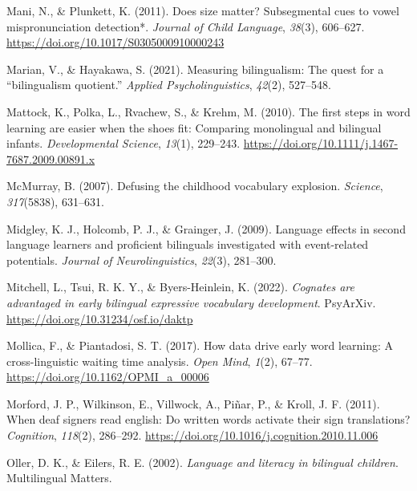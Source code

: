 \documentclass[
]{article}
\newlength{\cslhangindent}
\newlength{\cslentryspacingunit} %
\newenvironment{CSLReferences}[2] %
 {%
  \setlength{\parindent}{0pt}
  \ifodd #1
  \let\oldpar\par
  \def\par{\hangindent=\cslhangindent\oldpar}
  \fi
  \setlength{\parskip}{#2\cslentryspacingunit}
 }%
 {}
\begin{document}
\begin{CSLReferences}{1}{0}
\leavevmode{}%
Mani, N., \& Plunkett, K. (2011). Does size matter? Subsegmental cues to
vowel mispronunciation detection*. \emph{Journal of Child Language},
\emph{38}(3), 606--627. \url{https://doi.org/10.1017/S0305000910000243}

\leavevmode{}%
Marian, V., \& Hayakawa, S. (2021). Measuring bilingualism: The quest
for a {``bilingualism quotient.''} \emph{Applied Psycholinguistics},
\emph{42}(2), 527--548.

\leavevmode{}%
Mattock, K., Polka, L., Rvachew, S., \& Krehm, M. (2010). The first
steps in word learning are easier when the shoes fit: Comparing
monolingual and bilingual infants. \emph{Developmental Science},
\emph{13}(1), 229--243.
\url{https://doi.org/10.1111/j.1467-7687.2009.00891.x}

\leavevmode{}%
McMurray, B. (2007). Defusing the childhood vocabulary explosion.
\emph{Science}, \emph{317}(5838), 631--631.

\leavevmode{}%
Midgley, K. J., Holcomb, P. J., \& Grainger, J. (2009). Language effects
in second language learners and proficient bilinguals investigated with
event-related potentials. \emph{Journal of Neurolinguistics},
\emph{22}(3), 281--300.

\leavevmode{}%
Mitchell, L., Tsui, R. K. Y., \& Byers-Heinlein, K. (2022).
\emph{Cognates are advantaged in early bilingual expressive vocabulary
development}. {PsyArXiv}. \url{https://doi.org/10.31234/osf.io/daktp}

\leavevmode{}%
Mollica, F., \& Piantadosi, S. T. (2017). How data drive early word
learning: A cross-linguistic waiting time analysis. \emph{Open Mind},
\emph{1}(2), 67--77. \url{https://doi.org/10.1162/OPMI_a_00006}

\leavevmode{}%
Morford, J. P., Wilkinson, E., Villwock, A., Piñar, P., \& Kroll, J. F.
(2011). When deaf signers read english: Do written words activate their
sign translations? \emph{Cognition}, \emph{118}(2), 286--292.
\url{https://doi.org/10.1016/j.cognition.2010.11.006}

\leavevmode{}%
Oller, D. K., \& Eilers, R. E. (2002). \emph{Language and literacy in
bilingual children}. Multilingual Matters.


\end{CSLReferences}
\end{document}
